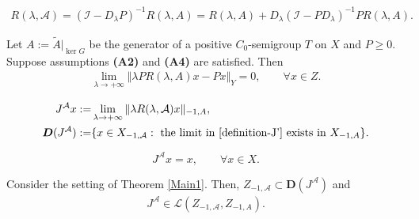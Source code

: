 \documentclass[10pt,a4paper]{amsart}
\def\calA{{\mathcal{A}}}
\def\calL{{\mathcal{L}}}
\def\la{\lambda}
\begin{document}
 	\begin{align}\label{resolvent-operator}
		R(\lambda, \calA) = (\mathcal{I}-D_\lambda P)^{-1} R(\lambda, A)
		= R(\lambda, A) + D_\lambda (\mathcal{I}-P D_\lambda)^{-1} P R(\lambda, A).
	\end{align}

	\begin{lemma}\label{P-regularity}
		Let $A := \tilde{A}|_{\ker G}$ be the generator of a positive $C_0$-semigroup $T$ on $X$ and $P \ge 0$. Suppose assumptions {\bf (A2)} and {\bf (A4)} are satisfied. Then
		\begin{align}\label{Limit-Px}
			\lim_{\la \to +\infty} \Vert \la P R(\la,A)x-Px\Vert_Y=0, \qquad \forall x\in Z.
		\end{align}
	\end{lemma}

	\begin{align}
		 J^\calA x:=&\lim_{\la \to +\infty} \Vert \la R(\la,\calA)x\Vert_{-1,A},\label{definition-J'}\\
		  {\bm D}(J^\calA):=&\{x\in X_{-1,\calA}: \text{ the limit in \eqref{definition-J'}}\text{ exists in } X_{-1,A}\}. \notag
	\end{align}

	\begin{equation}\label{extension-identityJ'}
		J^\calA x=x,\qquad \forall x\in X.
	\end{equation}

	\begin{lemma}\label{technical-lem2}
		Consider the setting of Theorem \ref{Main1}. Then, $Z_{-1,\calA}\subset {\bm D}(J^\calA)$ and
		\begin{align}\label{boundness-J'}
			J^\calA \in \calL(Z_{-1,\calA},Z_{-1,A}).
		\end{align}
	\end{lemma}
\end{document}

